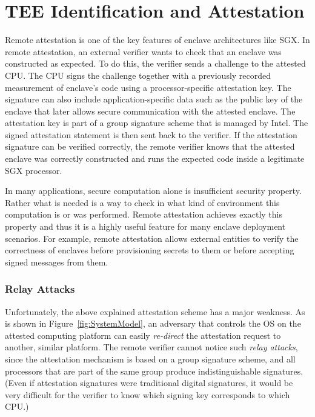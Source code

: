
\section*{TEE Identification and Attestation}

Remote attestation is one of the key features of enclave architectures like SGX. In remote attestation, an external verifier wants to check that an enclave was constructed as expected. To do this, the verifier sends a challenge to the attested CPU. The CPU signs the challenge together with a previously recorded measurement of enclave's code using a processor-specific attestation key. The signature can also include application-specific data such as the public key of the enclave that later allows secure communication with the attested enclave. The attestation key is part of a group signature scheme that is managed by Intel. The signed attestation statement is then sent back to the verifier. If the attestation signature can be verified correctly, the remote verifier knows that the attested enclave was correctly constructed and runs the expected code inside a legitimate SGX processor. 

In many applications, secure computation alone is insufficient security property. Rather what is needed is a way to check in what kind of environment this computation is or was performed. Remote attestation achieves exactly this property and thus it is a highly useful feature for many enclave deployment scenarios. For example, remote attestation allows external entities to verify the correctness of enclaves before provisioning secrets to them or before accepting signed messages from them.  

\subsubsection*{Relay Attacks}

Unfortunately, the above explained attestation scheme has a major weakness. As is shown in Figure~\ref{fig:SystemModel}, an adversary that controls the OS on the attested computing platform can easily \emph{re-direct} the attestation request to another, similar platform. The remote verifier cannot notice such \emph{relay attacks}, since the attestation mechanism is based on a group signature scheme, and all processors that are part of the same group produce indistinguishable signatures. (Even if attestation signatures were traditional digital signatures, it would be very difficult for the verifier to know which signing key corresponds to which CPU.) 

